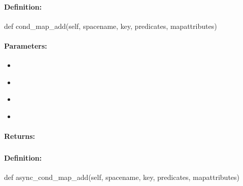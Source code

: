 \paragraph{Definition:}
\begin{pythoncode}
def cond_map_add(self, spacename, key, predicates, mapattributes)
\end{pythoncode}

\paragraph{Parameters:}
\begin{itemize}[noitemsep]
\item {}\\

\item {}\\

\item {}\\

\item {}\\

\end{itemize}

\paragraph{Returns:}


\pagebreak
\subsubsection{}
\label{api:python:async_cond_map_add}


\paragraph{Definition:}
\begin{pythoncode}
def async_cond_map_add(self, spacename, key, predicates, mapattributes)
\end{pythoncode}

